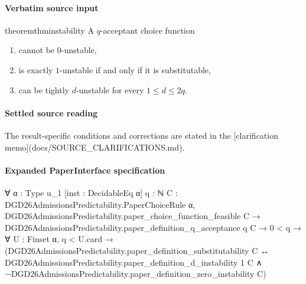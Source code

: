 \documentclass[10pt]{article}
\begin{document}
\paragraph{Verbatim source input}
\begin{ReviewVerbatim}
\begin{restatable}{theorem}{thminstability}
\label{thm:instability}
A $q$-acceptant choice function
\begin{enumerate}
    \item cannot be $0$-unstable,
    \item  is exactly $1$-unstable if and only if it is substitutable,
    \item can be tightly $d$-unstable for every $1\leq d \leq 2q$.
\end{enumerate}

\end{restatable}%
\end{ReviewVerbatim}

\paragraph{Settled source reading}
The result-\allowbreak{}specific conditions and corrections are stated in the [clarification memo](docs/\allowbreak{}SOURCE\_\allowbreak{}CLARIFICATIONS.\allowbreak{}md).\allowbreak{}

\paragraph{Expanded PaperInterface specification}
\begin{ReviewVerbatim}
∀ {α : Type u_1} [inst : DecidableEq α] {q : ℕ} {C : DGD26AdmissionsPredictability.PaperChoiceRule α},
  DGD26AdmissionsPredictability.paper_choice_function_feasible C →
    DGD26AdmissionsPredictability.paper_definition_q_acceptance q C →
      0 < q →
        ∀ {U : Finset α},
          q < U.card →
            (DGD26AdmissionsPredictability.paper_definition_substitutability C ↔
              DGD26AdmissionsPredictability.paper_definition_d_instability 1 C ∧
                ¬DGD26AdmissionsPredictability.paper_definition_zero_instability C)
\end{ReviewVerbatim}
\end{document}
